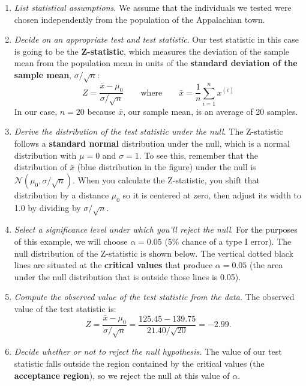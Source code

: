 \begin{enumerate}
\item \textit{List statistical {assumptions}}. We assume that the individuals we tested were chosen independently from the population of the Appalachian town.
\item \textit{Decide on an appropriate test and test statistic}. Our test statistic in this case is going to be the \textbf{Z-statistic}, which measures the deviation of the sample mean from the population mean in units of the \textbf{standard deviation of the sample mean}, $\sigma/\sqrt{n}$:
$$ Z = \frac{\bar{x} - \mu_0}{\sigma / \sqrt{n}} \qquad \text{where} \qquad \bar{x} = \frac{1}{n} \sum_{i=1}^n x^{(i)}$$
In our case, $n = 20$ because $\bar{x}$, our sample mean, is an average of 20 samples.  
\item \textit{Derive the distribution of the test statistic under the null}. The Z-statistic follows a \textbf{standard normal} distribution under the null, which is a normal distribution with $\mu=0$ and $\sigma=1$. To see this, remember that the distribution of $\bar{x}$ (blue distribution in the figure) under the null is $\mathcal{N}(\mu_0, \sigma/\sqrt{n})$. When you calculate the Z-statistic, you shift that distribution by a distance $\mu_0$ so it is centered at zero, then adjust its width to 1.0 by dividing by $\sigma/\sqrt{n}$.
\item \textit{Select a {significance level} under which you'll reject the null}. For the purposes of this example, we will choose $\alpha = 0.05$ (5\% chance of a type I error). The null distribution of the Z-statistic is shown below. The vertical dotted black lines are situated at the \textbf{critical values} that produce $\alpha = 0.05$ (the area under the null distribution that is outside those lines is 0.05). 
\item \textit{Compute the observed value of the test statistic from the data.} The observed value of the test statistic is:
$$ Z = \frac{\bar{x} - \mu_0}{\sigma / \sqrt{n}} = \frac{125.45 - 139.75}{21.40/\sqrt{20}} = -2.99. $$
\item \textit{Decide whether or not to reject the null hypothesis.} The value of our test statistic falls outside the region contained by the critical values (the \textbf{acceptance region}), so we reject the null at this value of $\alpha$.
\end{enumerate}